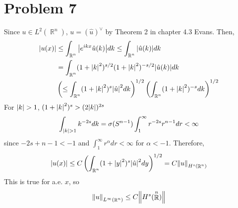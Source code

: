 \documentclass{article}
\DeclareMathOperator{\rr}{\mathbb{R}}
\begin{document}
\section*{Problem 7}
Since $u\in L^2(\rr^n)$, $u=(\hat{u})^\vee$ by Theorem 2 in chapter 4.3 Evans. Then,
\begin{equation*}
\begin{split}
\abs{u(x)}&\leq \int_{\rr^n}\abs{e^{ikx}\hat{u}(k)}dk\leq \int_{\rr^n}\abs{\hat{u}(k)}dk \\
&=\int_{\rr^n}(1+\abs{k}^2)^{s/2}(1+\abs{k}^2)^{-s/2}\abs{\hat{u}(k)}dk \\
&\left(\leq \int_{\rr^n}(1+\abs{k}^2)^{s}\abs{\hat{u}}^2dk\right)^{1/2}\left(\int_{\rr^n}(1+\abs{k}^2)^{-s}dk\right)^{1/2}
\end{split}
\end{equation*}
For $\abs{k}>1$, $(1+\abs{k}^2)^s> (2\abs{k})^{2s}$
\begin{equation*}
\int_{\abs{k}>1} k^{-2s}dk=\sigma(S^{n-1})\int_1^\infty r^{-2s}r^{n-1}dr<\infty
\end{equation*}
since $-2s+n-1<-1$ and $\int_1^\infty r^\alpha dr<\infty$ for $\alpha<-1$. Therefore,
\begin{equation*}
\abs{u(x)}\leq C\left(\int_{\rr^n}(1+\abs{y}^2)^s \abs{\hat{u}}^2 dy\right)^{1/2}=C\norm{u}_{H^s(\rr^n)}
\end{equation*}
This is true for a.e. $x$, so
\begin{equation*}
\norm{u}_{L^\infty(\rr^n)}\leq C\norm{H^s(\rr^n)}
\end{equation*}
\end{document}
